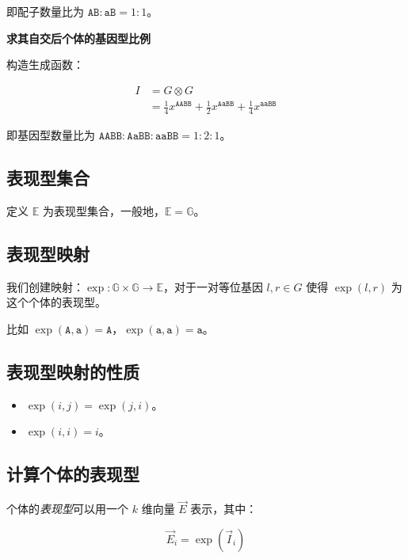 \documentclass{article}
\begin{document}
即配子数量比为 $\texttt{AB} : \texttt{aB}=1:1$。

\textbf{求其自交后个体的基因型比例}

构造生成函数：

$$\begin{aligned}
    I &= G \otimes G \\
        &= \frac{1}{4} x^{\texttt{AABB}} + \frac{1}{2} x^{\texttt{AaBB}} + \frac{1}{4} x^{\texttt{aaBB}}
\end{aligned}$$

即基因型数量比为 $\texttt{AABB} : \texttt{AaBB} : \texttt{aaBB}=1:2:1$。

\subsection{表现型集合}

定义 $\mathbb{E}$ 为表现型集合，一般地，$\mathbb{E}=\mathbb{G}$。

\subsection{表现型映射}

我们创建映射：$\operatorname{exp}:\mathbb{G} \times \mathbb{G} \to \mathbb{E}$，对于一对等位基因 $l,r \in G$ 使得 $\operatorname{exp}(l,r)$ 为这个个体的表现型。


比如 $\operatorname{exp}(\texttt{A},\texttt{a})=\texttt{A}$，$\operatorname{exp}(\texttt{a},\texttt{a})=\texttt{a}$。

\subsection{表现型映射的性质}

\begin{itemize}
    \item $\operatorname{exp}(i,j)=\operatorname{exp}(j,i)$。
    \item $\operatorname{exp}(i,i)=i$。
\end{itemize}

\subsection{计算个体的表现型}

个体的\textsl{表现型}可以用一个 $k$ 维向量 $\vec E$ 表示，其中：

$$\vec E_i=\operatorname{exp}(\vec I_i)$$
\end{document}
